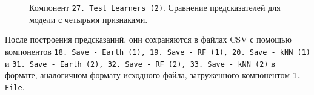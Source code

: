 \begin{figure}[H]
    \caption{Компонент \texttt{27. Test Learners (2)}. Сравнение предсказателей для модели с четырьмя признаками.}
    \label{img:27-Test-Learners-2}
\end{figure}

После построения предсказаний, они сохраняются в файлах CSV с помощью компонентов \texttt{18. Save - Earth (1), 19. Save - RF (1), 20. Save - kNN (1)} и \texttt{31. Save - Earth (2), 32. Save - RF (2), 33. Save - kNN (2)} в формате, аналогичном формату исходного файла, загруженного компонентом \texttt{1. File}.
